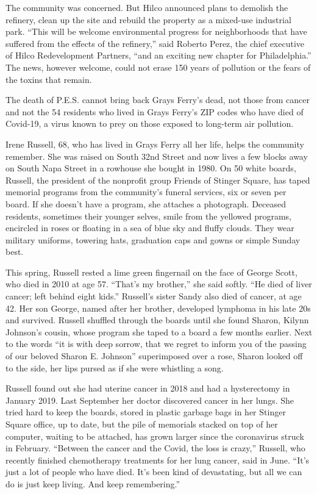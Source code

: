 The community was concerned. But Hilco announced plans to demolish the
refinery, clean up the site and rebuild the property as a mixed-use
industrial park. ``This will be welcome environmental progress for
neighborhoods that have suffered from the effects of the refinery,''
said Roberto Perez, the chief executive of Hilco Redevelopment Partners,
``and an exciting new chapter for Philadelphia.'' The news, however
welcome, could not erase 150 years of pollution or the fears of the
toxins that remain.

The death of P.E.S. cannot bring back Grays Ferry's dead, not those from
cancer and not the 54 residents who lived in Grays Ferry's ZIP codes who
have died of Covid-19, a virus known to prey on those exposed to
long-term air pollution.

Irene Russell, 68, who has lived in Grays Ferry all her life, helps the
community remember. She was raised on South 32nd Street and now lives a
few blocks away on South Napa Street in a rowhouse she bought in 1980.
On 50 white boards, Russell, the president of the nonprofit group
Friends of Stinger Square, has taped memorial programs from the
community's funeral services, six or seven per board. If she doesn't
have a program, she attaches a photograph. Deceased residents, sometimes
their younger selves, smile from the yellowed programs, encircled in
roses or floating in a sea of blue sky and fluffy clouds. They wear
military uniforms, towering hats, graduation caps and gowns or simple
Sunday best.

This spring, Russell rested a lime green fingernail on the face of
George Scott, who died in 2010 at age 57. ``That's my brother,'' she
said softly. ``He died of liver cancer; left behind eight kids.''
Russell's sister Sandy also died of cancer, at age 42. Her son George,
named after her brother, developed lymphoma in his late 20s and
survived. Russell shuffled through the boards until she found Sharon,
Kilynn Johnson's cousin, whose program she taped to a board a few months
earlier. Next to the words ``it is with deep sorrow, that we regret to
inform you of the passing of our beloved Sharon E. Johnson''
superimposed over a rose, Sharon looked off to the side, her lips pursed
as if she were whistling a song.

Russell found out she had uterine cancer in 2018 and had a hysterectomy
in January 2019. Last September her doctor discovered cancer in her
lungs. She tried hard to keep the boards, stored in plastic garbage bags
in her Stinger Square office, up to date, but the pile of memorials
stacked on top of her computer, waiting to be attached, has grown larger
since the coronavirus struck in February. ``Between the cancer and the
Covid, the loss is crazy,'' Russell, who recently finished chemotherapy
treatments for her lung cancer, said in June. ``It's just a lot of
people who have died. It's been kind of devastating, but all we can do
is just keep living. And keep remembering.''


